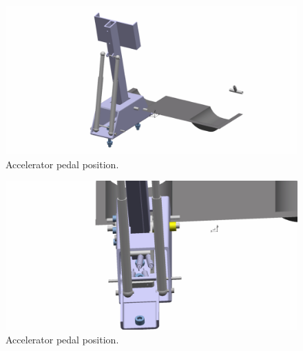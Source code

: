 \begin{figure}[H]
	\centering
	\includegraphics[width=.5\textwidth]{./img/ACC-pedal-pos.jpg}
	\caption{Accelerator pedal position.}
	\label{fig:ACC-position}
\end{figure}

\begin{figure}[H]
	\centering
	\includegraphics[width=.5\textwidth]{./img/ACC-pedal-pos2.jpg}
	\caption{Accelerator pedal position.}
	\label{fig:ACC-position2}
\end{figure}

